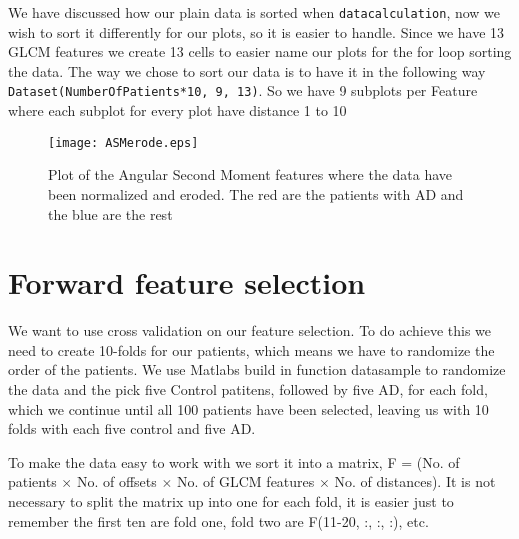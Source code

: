 We have discussed how our plain data is sorted when \texttt{datacalculation}, now we wish to sort it differently for our plots, so it is easier to handle. Since we have 13 GLCM features  we create 13 cells to easier name our plots for the for loop sorting the data. The way we chose to sort our data is to have it in the following way \texttt{Dataset(NumberOfPatients*10, 9, 13)}. So we have 9 subplots per Feature where each subplot for every plot have distance 1 to 10 

\begin{figure}[H]
  \centering
  \texttt{[image: ASMerode.eps]}
  \caption{Plot of the Angular Second Moment features where the data have been normalized and eroded. The red are the patients with AD and the blue are the rest}\label{fig:ASMNormalizedEroded}
\end{figure}



\section{Forward feature selection}

We want to use cross validation on our feature selection. To do achieve this we need to create 10-folds for our patients, which means we have to randomize the order of the patients. We use Matlabs build in function datasample to randomize the data and the pick five Control patitens, followed by five AD, for each fold, which we continue until all 100 patients have been selected, leaving us with 10 folds with each five control and five AD.

To make the data easy to work with we sort it into a matrix, F = (No. of patients $\times$ No. of offsets $\times$ No. of GLCM features $\times$ No. of distances). It is not necessary to split the matrix up into one for each fold, it is easier just to remember the first ten are fold one, fold two are F(11-20, :, :, :), etc.


